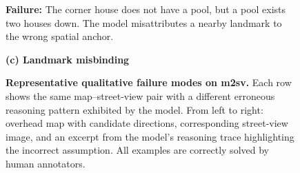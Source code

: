 \begin{figure}[t]
\begin{minipage}[t]{\linewidth}
\begin{minipage}[t]{0.50\linewidth}
{\begin{minipage}[t]{\linewidth}
        \medskip
        \textbf{Failure:}
        The corner house does not have a pool, but a pool exists two houses down.
        The model misattributes a nearby landmark to the wrong spatial anchor.
        \end{minipage}
      }
    \end{minipage}
  
    \vspace{0.4em}
    \centering
    {\small\textbf{(c) Landmark misbinding}}
  \end{minipage}

  
  \caption{
  \textbf{Representative qualitative failure modes on m2sv.}
  Each row shows the same map--street-view pair with a different erroneous reasoning
  pattern exhibited by the model. From left to right: overhead map with candidate
  directions, corresponding street-view image, and an excerpt from the model’s
  reasoning trace highlighting the incorrect assumption. All examples are correctly
  solved by human annotators.
  }
  \label{fig:failure-examples}
  \end{figure}

